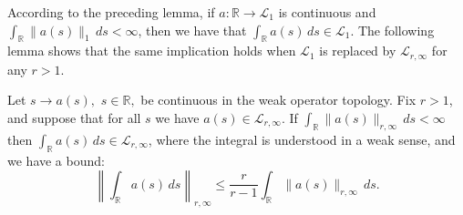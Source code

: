     According to the preceding lemma, if $a:\mathbb{R}\to \mathcal{L}_1$ is continuous and $\int_{\mathbb{R}} \|a(s)\|_1 \,ds < \infty$, then we
    have that $\int_{\mathbb{R}} a(s)\,ds \in \mathcal{L}_1$. The following lemma shows that the same implication holds when $\mathcal{L}_1$ is replaced
    by $\mathcal{L}_{r,\infty}$ for any $r > 1$.
    
    \begin{prop}\label{peter norm lemma} 
        Let $s\to a(s),$ $s\in\mathbb{R},$ be continuous in the weak operator topology. Fix $r > 1$, and suppose that for all $s$ we have $a(s)\in\mathcal{L}_{r,\infty}$.
        If $\int_{\mathbb{R}} \|a(s)\|_{r,\infty}\,ds < \infty$ then $\int_{\mathbb{R}} a(s)\,ds \in \mathcal{L}_{r,\infty}$, where the integral is understood in a weak sense, and we have a bound:
        \begin{equation*}
            \left\|\int_{\mathbb{R}} a(s)\,ds\right\|_{r,\infty} \leq \frac{r}{r-1}\int_{\mathbb{R}} \|a(s)\|_{r,\infty}\,ds.
        \end{equation*}
    \end{prop}
